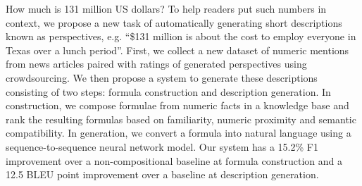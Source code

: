 How much is 131 million US dollars? To help readers put such numbers in context, we propose a new task of automatically generating short descriptions known as perspectives, e.g. ``\$131 million is about the cost to employ everyone in Texas over a lunch period''. First, we collect a new dataset of numeric mentions from news articles paired with ratings of generated perspectives using crowdsourcing. We then propose a system to generate these descriptions consisting of two steps: formula construction and description generation. In construction, we compose formulae from numeric facts in a knowledge base and rank the resulting formulas based on familiarity, numeric proximity and semantic compatibility. In generation, we convert a formula into natural language using a sequence-to-sequence neural network model. Our system has a 15.2\% F1 improvement over a non-compositional baseline at formula construction and a 12.5 BLEU point improvement over a baseline at description generation.
